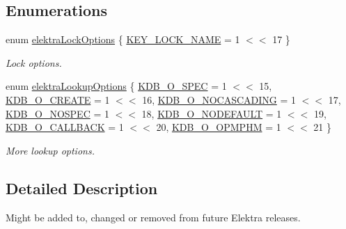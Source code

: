 \subsection*{Enumerations}
\begin{DoxyCompactItemize}
\item 
enum \hyperlink{group__proposal_ga824e384e248ed1e05448294bff7271c0}{elektra\+Lock\+Options} \{ \hyperlink{group__proposal_gga824e384e248ed1e05448294bff7271c0a4813b0cfdefeb676e35f599ef763c265}{K\+E\+Y\+\_\+\+L\+O\+C\+K\+\_\+\+N\+A\+ME} = 1 $<$$<$ 17
 \}\begin{DoxyCompactList}\small\item\em Lock options. \end{DoxyCompactList}
\item 
enum \hyperlink{group__proposal_ga93673533c4c8eb1fdfca76b98c5f49b0}{elektra\+Lookup\+Options} \{ \newline
\hyperlink{group__proposal_gga93673533c4c8eb1fdfca76b98c5f49b0a187bc7e52493fb8f1eb5693015478dae}{K\+D\+B\+\_\+\+O\+\_\+\+S\+P\+EC} = 1 $<$$<$ 15, 
\hyperlink{group__proposal_gga93673533c4c8eb1fdfca76b98c5f49b0a72155bedec545b2e96372ab28169620a}{K\+D\+B\+\_\+\+O\+\_\+\+C\+R\+E\+A\+TE} = 1 $<$$<$ 16, 
\hyperlink{group__proposal_gga93673533c4c8eb1fdfca76b98c5f49b0abc4c6e04823b6d684f4db8df3b84f326}{K\+D\+B\+\_\+\+O\+\_\+\+N\+O\+C\+A\+S\+C\+A\+D\+I\+NG} = 1 $<$$<$ 17, 
\hyperlink{group__proposal_gga93673533c4c8eb1fdfca76b98c5f49b0a420d8ea3671ffea4fe8400570cfe5c8d}{K\+D\+B\+\_\+\+O\+\_\+\+N\+O\+S\+P\+EC} = 1 $<$$<$ 18, 
\newline
\hyperlink{group__proposal_gga93673533c4c8eb1fdfca76b98c5f49b0abdcfd6d28200b5c650615fba430496bb}{K\+D\+B\+\_\+\+O\+\_\+\+N\+O\+D\+E\+F\+A\+U\+LT} = 1 $<$$<$ 19, 
\hyperlink{group__proposal_gga93673533c4c8eb1fdfca76b98c5f49b0a70ac5d04d6f855e17e4c33dfeeddd39e}{K\+D\+B\+\_\+\+O\+\_\+\+C\+A\+L\+L\+B\+A\+CK} = 1 $<$$<$ 20, 
\hyperlink{group__proposal_gga93673533c4c8eb1fdfca76b98c5f49b0afe9f6ff6e374540baf600a918b07ee6e}{K\+D\+B\+\_\+\+O\+\_\+\+O\+P\+M\+P\+HM} = 1 $<$$<$ 21
 \}\begin{DoxyCompactList}\small\item\em More lookup options. \end{DoxyCompactList}
\end{DoxyCompactItemize}


\subsection{Detailed Description}
Might be added to, changed or removed from future Elektra releases. 



